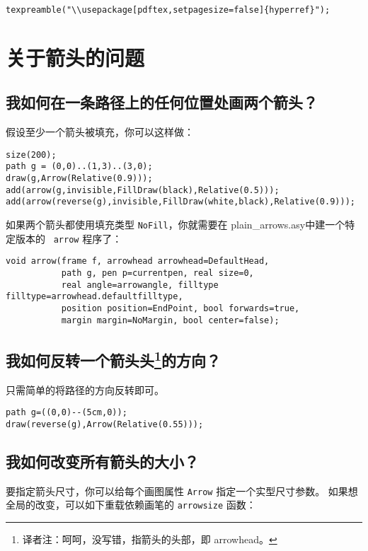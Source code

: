 \begin{lstlisting}
texpreamble("\\usepackage[pdftex,setpagesize=false]{hyperref}");
\end{lstlisting}

\section{\label{Q5}关于箭头的问题}
\subsection{\label{Q5.1}我如何在一条路径上的任何位置处画两个箭头？}
假设至少一个箭头被填充，你可以这样做：

\begin{lstlisting}
size(200); 
path g = (0,0)..(1,3)..(3,0); 
draw(g,Arrow(Relative(0.9))); 
add(arrow(g,invisible,FillDraw(black),Relative(0.5))); 
add(arrow(reverse(g),invisible,FillDraw(white,black),Relative(0.9))); 
\end{lstlisting}

如果两个箭头都使用填充类型 \verb|NoFill|，你就需要在 plain\_arrows.asy中建一个特定版本的
~\verb|arrow| 程序了：

\begin{lstlisting}
void arrow(frame f, arrowhead arrowhead=DefaultHead,
           path g, pen p=currentpen, real size=0,
           real angle=arrowangle, filltype filltype=arrowhead.defaultfilltype,
           position position=EndPoint, bool forwards=true,
           margin margin=NoMargin, bool center=false);
\end{lstlisting}

\subsection{\label{Q5.2}我如何反转一个箭头头\protect\footnote{译者注：呵呵，没写错，指箭头的头部，即 arrowhead。}的方向？}
只需简单的将路径的方向反转即可。
\begin{lstlisting}
path g=((0,0)--(5cm,0));
draw(reverse(g),Arrow(Relative(0.55)));
\end{lstlisting}

\subsection{\label{Q5.3}我如何改变所有箭头的大小？}
要指定箭头尺寸，你可以给每个画图属性 \verb|Arrow| 指定一个实型尺寸参数。
如果想全局的改变，可以如下重载依赖画笔的 \verb|arrowsize| 函数：

